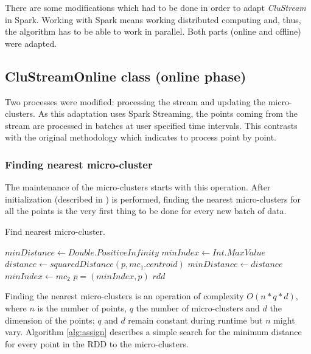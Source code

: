 There are some modifications which had to be done in order to adapt \textit{CluStream} in Spark. Working with Spark means working distributed computing and, thus, the algorithm has to be able to work in parallel. Both parts (online and offline) were adapted.

\subsection{CluStreamOnline class (online phase)}

Two processes were modified: processing the stream and updating the micro-clusters. As this adaptation uses Spark Streaming, the points coming from the stream are processed in batches at user specified time intervals. This contrasts with the original methodology which indicates to process point by point.

\subsubsection{Finding nearest micro-cluster}

The maintenance of the micro-clusters starts with this operation. After initialization (described in \cite{clustreamOrig}) is performed, finding the nearest micro-clusters for all the points is the very first thing to be done for every new batch of data.

\begin{algorithm}
 \caption{Find nearest micro-cluster.}\label{alg:assign}
 \begin{algorithmic}[1]
  \vspace{10pt}
  \State $minDistance \gets Double.PositiveInfinity$
  \State $minIndex \gets Int.MaxValue$
  \State $distance \gets squaredDistance(p, mc_1.centroid)$
  \State $minDistance \gets distance$
  \State $minIndex \gets mc_2$
  \EndIf
  \EndFor
  \State $p = (minIndex,p)$
  \EndFor
  \Return $rdd$
 \end{algorithmic}
\end{algorithm}

Finding the nearest micro-clusters is an operation of complexity $O(n*q*d)$, where $n$ is the number of points, $q$ the number of micro-clusters and $d$ the dimension of the points; $q$ and $d$ remain constant during runtime but $n$ might vary. Algorithm \ref{alg:assign} describes a simple search for the minimum distance for every point in the RDD to the micro-clusters. 

